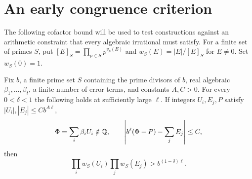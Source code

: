 \section{An early congruence criterion}\label{sec:arith}

The following cofactor bound will be used to test constructions against an arithmetic constraint that every algebraic irrational must satisfy.
For a finite set of primes $S$, put $[E]_S=\prod_{p\in S}p^{v_p(E)}$ and $w_S(E)=|E|/[E]_S$ for $E\ne0$. Set $w_S(0)=1$.

\begin{theorem}\label{thm:cofactor}
Fix $b$, a finite prime set $S$ containing the prime divisors of $b$, real algebraic $\beta_1,\ldots,\beta_t$, a finite number of error terms, and constants $A,C>0$. For every $0<\delta<1$ the following holds at sufficiently large $\ell$. If integers $U_i,E_j,P$ satisfy $|U_i|,|E_j|\le Cb^{A\ell}$,
\[
 \Phi=\sum_i\beta_i U_i\notin\mathbb Q,\qquad
 \left|b^\ell(\Phi-P)-\sum_jE_j\right|\le C,
\]
then
\[
 \prod_i w_S(U_i)\prod_j w_S(E_j)>b^{(1-\delta)\ell}.
\]
\end{theorem}

